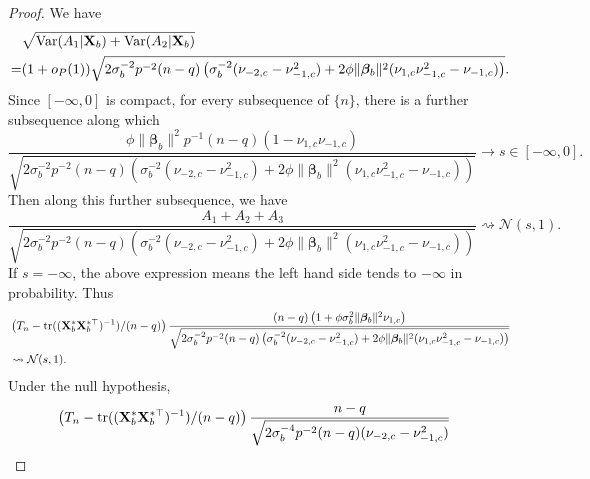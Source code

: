 \documentclass[11pt]{article}
\DeclareMathOperator{\mytr}{tr}
\DeclareMathOperator{\myVar}{Var}
\newcommand{\bfsym}[1]{\ensuremath{\boldsymbol{#1}}}
\def\bbeta{\bfsym \beta}
\theoremstyle{plain}
\theoremstyle{definition}
\theoremstyle{remark}
\begin{document}
\begin{appendices}
\begin{proof}
We have 
\begin{equation*}
    \begin{split}
    &\sqrt{\myVar(A_1|\BX_b) + \myVar (A_2 |\BX_b)}
    \\
    =&(1+o_P(1))
    \sqrt{
    2\sigma_b^{-2} p^{-2} (n-q)
    \left( 
        \sigma_b^{-2} (\nu_{-2,c} - \nu_{-1,c}^2)
        +
        2\phi\|\bbeta_b\|^2 (\nu_{1,c} \nu_{-1,c}^2 -\nu_{-1,c})
    \right)
}
.
    \end{split}
\end{equation*}
Since $[-\infty,0]$ is compact, for every subsequence of $\{n\}$, there is a further subsequence along which 
\begin{equation*}
    \frac{
\phi \|\bbeta_b\|^2 p^{-1} (n-q) \left(1- \nu_{1,c}\nu_{-1,c}\right)
    }{
    \sqrt{
    2\sigma_b^{-2} p^{-2} (n-q)
    \left( 
        \sigma_b^{-2} (\nu_{-2,c} - \nu_{-1,c}^2)
        +
        2\phi \|\bbeta_b\|^2 (\nu_{1,c} \nu_{-1,c}^2 -\nu_{-1,c})
    \right)
}
    }
    \to s \in [-\infty, 0].
\end{equation*}
Then along this further subsequence, we have
\begin{equation*}
    \frac{A_1+A_2+A_3}{
        \sqrt{
    2\sigma_b^{-2} p^{-2} (n-q)
    \left( 
        \sigma_b^{-2} (\nu_{-2,c} - \nu_{-1,c}^2)
        +
        2\phi \|\bbeta_b\|^2 (\nu_{1,c} \nu_{-1,c}^2 -\nu_{-1,c})
    \right)
}
}
\rightsquigarrow \mathcal N(s,1).
\end{equation*}
If $s=-\infty$, the above expression means the left hand side tends to $-\infty$ in probability.
Thus
\begin{equation*}
    \begin{split}
        &
\left(
    T_n - \mytr((\BX_b^* \BX_b^{*\top})^{-1})/(n-q)
\right)
    \frac{
     (n-q)\left(
            1+ \phi \sigma_b^2 \|\bbeta_b\|^2  \nu_{1,c}
\right)
    }{
        \sqrt{
    2\sigma_b^{-2} p^{-2} (n-q)
    \left( 
        \sigma_b^{-2} (\nu_{-2,c} - \nu_{-1,c}^2)
        +
        2\phi \|\bbeta_b\|^2 (\nu_{1,c} \nu_{-1,c}^2 -\nu_{-1,c})
    \right)
}
    } 
\\
&
\rightsquigarrow \mathcal N(s,1).
    \end{split}
\end{equation*}
Under the null hypothesis,
\begin{equation*}
    \begin{split}
        &
\left(
    T_n - \mytr((\BX_b^* \BX_b^{*\top})^{-1})/(n-q)
\right)
    \frac{
     n-q
    }{
        \sqrt{
    2\sigma_b^{-4} p^{-2} (n-q)
         (\nu_{-2,c} - \nu_{-1,c}^2)
}}
\end{split}
\end{equation*}
\end{proof}
\end{appendices}
\end{document}
